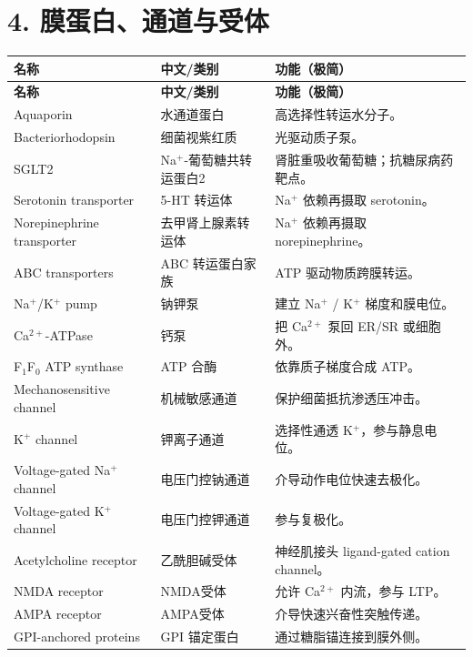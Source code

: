 \documentclass[11pt,fontset=none]{ctexart}
\begin{document}
\section*{4. 膜蛋白、通道与受体}
\begin{longtable}{L{3.2cm} L{3.8cm} L{8.5cm}}
\toprule
\textbf{名称} & \textbf{中文/类别} & \textbf{功能（极简）} \\
\midrule
\endfirsthead
\toprule
\textbf{名称} & \textbf{中文/类别} & \textbf{功能（极简）} \\
\midrule
\endhead
\bottomrule
\endfoot
Aquaporin & 水通道蛋白 & 高选择性转运水分子。 \\
Bacteriorhodopsin & 细菌视紫红质 & 光驱动质子泵。 \\
SGLT2 & Na$^+$-葡萄糖共转运蛋白2 & 肾脏重吸收葡萄糖；抗糖尿病药靶点。 \\
Serotonin transporter & 5-HT 转运体 & Na$^+$ 依赖再摄取 serotonin。 \\
Norepinephrine transporter & 去甲肾上腺素转运体 & Na$^+$ 依赖再摄取 norepinephrine。 \\
ABC transporters & ABC 转运蛋白家族 & ATP 驱动物质跨膜转运。 \\
Na$^+$/K$^+$ pump & 钠钾泵 & 建立 Na$^+$ / K$^+$ 梯度和膜电位。 \\
Ca$^{2+}$-ATPase & 钙泵 & 把 Ca$^{2+}$ 泵回 ER/SR 或细胞外。 \\
F$_1$F$_0$ ATP synthase & ATP 合酶 & 依靠质子梯度合成 ATP。 \\
Mechanosensitive channel & 机械敏感通道 & 保护细菌抵抗渗透压冲击。 \\
K$^+$ channel & 钾离子通道 & 选择性通透 K$^+$，参与静息电位。 \\
Voltage-gated Na$^+$ channel & 电压门控钠通道 & 介导动作电位快速去极化。 \\
Voltage-gated K$^+$ channel & 电压门控钾通道 & 参与复极化。 \\
Acetylcholine receptor & 乙酰胆碱受体 & 神经肌接头 ligand-gated cation channel。 \\
NMDA receptor & NMDA受体 & 允许 Ca$^{2+}$ 内流，参与 LTP。 \\
AMPA receptor & AMPA受体 & 介导快速兴奋性突触传递。 \\
GPI-anchored proteins & GPI 锚定蛋白 & 通过糖脂锚连接到膜外侧。 \\
\end{longtable}
\end{document}
